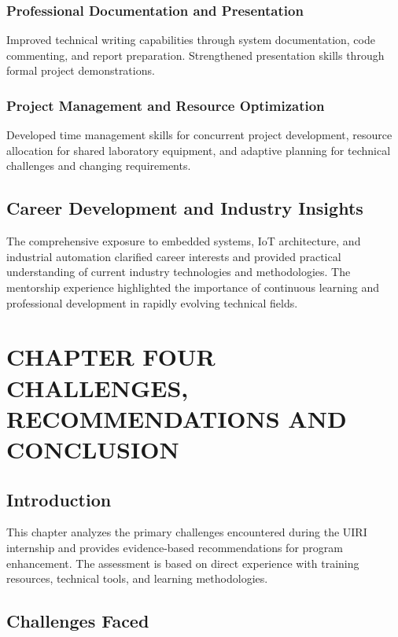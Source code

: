 \documentclass[12pt,a4paper]{report}
\begin{document}
\subsection{Professional Documentation and Presentation}
\noindent Improved technical writing capabilities through system documentation, code commenting, and report preparation. Strengthened presentation skills through formal project demonstrations.

\subsection{Project Management and Resource Optimization}
\noindent Developed time management skills for concurrent project development, resource allocation for shared laboratory equipment, and adaptive planning for technical challenges and changing requirements.

\section{Career Development and Industry Insights}

\noindent The comprehensive exposure to embedded systems, IoT architecture, and industrial automation clarified career interests and provided practical understanding of current industry technologies and methodologies. The mentorship experience highlighted the importance of continuous learning and professional development in rapidly evolving technical fields.

\newpage
\chapter[CHAPTER FOUR CHALLENGES, RECOMMENDATIONS AND CONCLUSION]{CHAPTER FOUR \\CHALLENGES, RECOMMENDATIONS AND CONCLUSION}

\section{Introduction}

\noindent This chapter analyzes the primary challenges encountered during the UIRI internship and provides evidence-based recommendations for program enhancement. The assessment is based on direct experience with training resources, technical tools, and learning methodologies.

\section{Challenges Faced}
\end{document}
